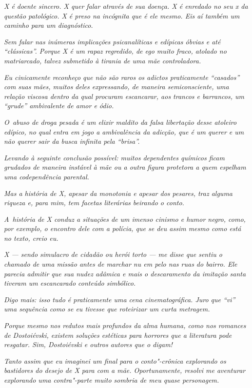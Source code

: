 \emph{X é doente sincero. X quer falar através de sua doença. X é
enredado no seu x da questão patológico. X é preso na incógnita que é
ele mesmo. Eis aí também um caminho para um diagnóstico.}

\emph{Sem falar nas inúmeras implicações psicanalíticas e edípicas
óbvias e até ``clássicas''. Porque X é um rapaz regredido, de ego muito
fraco, atolado no matriarcado, talvez submetido à tirania de uma mãe
controladora.}~

\emph{Eu cinicamente reconheço que não são raros os adictos praticamente
``casados'' com suas mães, muitos deles expressando, de maneira semiconsciente, uma relação viscosa dentro da qual procuram escancarar, aos
trancos e barrancos, um ``grude'' ambivalente de amor e ódio.}

\emph{O~abuso de droga pesada é um elixir maldito da falsa libertação
desse atoleiro edípico, no qual entra em jogo a ambivalência da adicção,
que é um querer e um não querer sair da busca infinita pela ``brisa''.}

\emph{Levando à seguinte conclusão possível: muitos dependentes químicos
ficam grudados de maneira instável à mãe ou a outra figura protetora a
quem espelham uma codependência parental.}

\emph{Mas a história de X, apesar da monotonia e apesar dos pesares, traz
alguma riqueza e, para mim, tem facetas literárias beirando o conto.}~

\emph{A~história de X conduz a situações de um imenso cinismo e humor
negro, como, por exemplo, o encontro dele com a polícia, que se deu
assim mesmo como está no texto, creio eu.}

\emph{X --- sendo simulacro de cidadão ou herói torto --- me disse que
sentiu o chamado de uma missão antes de marchar nu em pelo nas ruas do
bairro. Ele parecia admitir que sua nudez adâmica e mais o descaramento
da imitação santa tiveram um escancarado conteúdo simbólico.}

\emph{Digo mais: isso tudo é praticamente uma cena cinematográfica. Juro
que ``vi'' uma sequência como se eu tivesse que roteirizar um curta
metragem.}

\emph{Porque mesmo nos redutos mais profundos da alma humana, como nos
romances de Dostoiévski, existem soluções estéticas para horrores que a
literatura pode resgatar. Sim, Dostoiévski e outros autores que o
digam!}

\emph{Tanto assim que eu imaginei um final para o conto"-crônica
explorando os bastidores do desejo de X para com a mãe. Oportunamente,
resolvi me aventurar explorando uma contra"-parte muito sombria de meu
quase personagem.}

